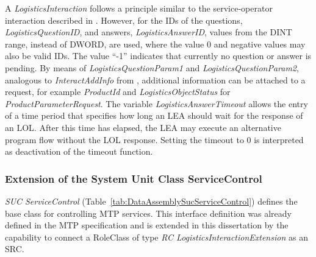 A \emph{LogisticsInteraction} follows a principle similar to the service-operator interaction described in \cite{PNO.2025.Part4}. However, for the IDs of the questions, \emph{LogisticsQuestionID}, and answers, \emph{LogisticsAnswerID}, values from the DINT range, instead of DWORD, are used, where the value 0 and negative values may also be valid IDs. The value \enquote{-1} indicates that currently no question or answer is pending. By means of \emph{LogisticsQuestionParam1} and \emph{LogisticsQuestionParam2}, analogous to \emph{InteractAddInfo} from \cite{PNO.2025.Part4}, additional information can be attached to a request, for example \emph{ProductId} and \emph{LogisticsObjectStatus} for \emph{ProductParameterRequest}. The variable \emph{LogisticsAnswerTimeout} allows the entry of a time period that specifies how long an LEA should wait for the response of an LOL. After this time has elapsed, the LEA may execute an alternative program flow without the LOL response. Setting the timeout to 0 is interpreted as deactivation of the timeout function.

\subsubsection{Extension of the System Unit Class ServiceControl}

\emph{SUC ServiceControl} (Table~\ref{tab:DataAssemblySucServiceControl}) defines the base class for controlling MTP services. This interface definition was already defined in the MTP specification and is extended in this dissertation by the capability to connect a RoleClass of type \emph{RC LogisticsInteractionExtension} as an SRC.

